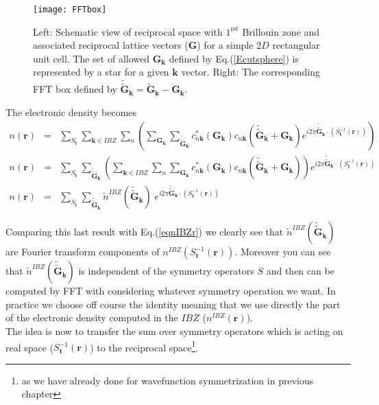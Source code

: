 \documentclass[a4paper,12pt]{report}
\begin{document}
\begin{figure}[!ht]
\centering
\begin{minipage}[c]{1.0\textwidth}
\texttt{[image: FFTbox]}
\end{minipage}
\vspace{0.27\textwidth}
\begin{minipage}[c]{0.8\textwidth}
\caption{\small Left: Schematic view of reciprocal space with $1^{\text{rst}}$ Brillouin zone and associated reciprocal lattice vectors ($\mathbf{G}$) for a simple $2D$ rectangular unit cell. The set of allowed $\mathbf{G}_{\mathbf{k}}$ defined by Eq.(\ref{Ecutsphere}) is represented by a star for a given $\mathbf{k}$ vector. Right: The corresponding FFT box defined by $\tilde{\tilde{\mathbf{G}}}_{\mathbf{k}} = \tilde{\mathbf{G}}_{\mathbf{k}} -\mathbf{G}_{\mathbf{k}}$.}
\vspace*{1.0ex}
\label{fig_FFTbox}
\end{minipage}
\end{figure}

The electronic density becomes
\begin{eqnarray}
n(\mathbf{r}) &=& \sum_{S_{\mathbf{t}}} \sum_{\mathbf{k} \in IBZ} \sum_n \left( \sum_{\mathbf{G}_{\mathbf{k}}} \sum_{\tilde{\tilde{\mathbf{G}}}_{\mathbf{k}}} c_{n\mathbf{k}}^{*}(\mathbf{G}_{\mathbf{k}}) c_{n\mathbf{k}}(\tilde{\tilde{\mathbf{G}}}_{\mathbf{k}}+\mathbf{G}_{\mathbf{k}}) e^{i2\pi \tilde{\tilde{\mathbf{G}}}_{\mathbf{k}} \cdotp \left( S_{\mathbf{t}}^{-1} (\mathbf{r})\right) } \right) \nonumber \\
n(\mathbf{r}) &=& \sum_{S_{\mathbf{t}}} \sum_{\tilde{\tilde{\mathbf{G}}}_{\mathbf{k}}} \left( \sum_{\mathbf{k} \in IBZ} \sum_n \sum_{\mathbf{G}_{\mathbf{k}}}  c_{n\mathbf{k}}^{*}(\mathbf{G}_{\mathbf{k}}) c_{n\mathbf{k}}(\tilde{\tilde{\mathbf{G}}}_{\mathbf{k}}+\mathbf{G}_{\mathbf{k}})\right) e^{i2\pi \tilde{\tilde{\mathbf{G}}}_{\mathbf{k}} \cdotp \left( S_{\mathbf{t}}^{-1} (\mathbf{r})\right) }  \nonumber \\
n(\mathbf{r}) &=& \sum_{S_{\mathbf{t}}} \sum_{\tilde{\tilde{\mathbf{G}}}_{\mathbf{k}}} \tilde{n}^{IBZ}(\tilde{\tilde{\mathbf{G}}}_{\mathbf{k}})\; e^{i2\pi \tilde{\tilde{\mathbf{G}}}_{\mathbf{k}} \cdotp \left( S_{\mathbf{t}}^{-1} (\mathbf{r})\right) }
\end{eqnarray}

Comparing this last result with Eq.(\ref{eqnIBZr}) we clearly see that $\tilde{n}^{IBZ}(\tilde{\tilde{\mathbf{G}}}_{\mathbf{k}})$ are Fourier transform components of $n^{IBZ}\left(S_{\mathbf{t}}^{-1}(\mathbf{r})\right)$. Moreover you can see that $\tilde{n}^{IBZ}(\tilde{\tilde{\mathbf{G}}}_{\mathbf{k}})$ is independent of the symmetry operators $S$ and then can be computed by FFT with considering whatever symmetry operation we want. In practice we choose off course the identity meaning that we use directly the part of the electronic density computed in the $IBZ$ ($n^{IBZ}(\mathbf{r})$).\\
The idea is now to transfer the sum over symmetry operators which is acting on real space ($S_{\mathbf{t}}^{-1}(\mathbf{r})$) to the reciprocal space\footnote{as we have already done for wavefunction symmetrization in previous chapter}.
\end{document}

